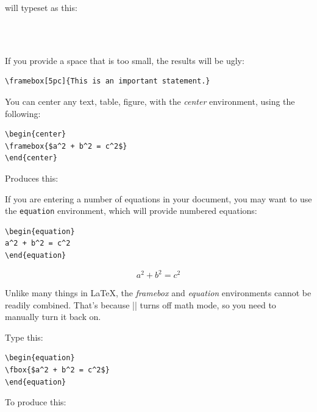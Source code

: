 will typeset as this:

\\
\\

If you provide a space that is too small, the results will be ugly:

\begin{Verbatim}
\framebox[5pc]{This is an important statement.}
\end{Verbatim}


You can center any text, table, figure, \etc with the \emph{center}
environment, using the following:

\begin{Verbatim}
\begin{center}
\framebox{$a^2 + b^2 = c^2$}
\end{center}
\end{Verbatim}

Produces this:

\begin{center}
\end{center}

If you are entering a number of equations in your document, you may want to use
the \texttt{equation} environment, which will provide numbered equations:

\begin{Verbatim}
\begin{equation}
a^2 + b^2 = c^2
\end{equation}
\end{Verbatim}
\begin{equation}
a^2 + b^2 = c^2
\end{equation}

Unlike many things in \LaTeX, the \emph{framebox} and \emph{equation}
environments cannot be readily combined. That's because |\fbox| turns off math
mode, so you need to manually turn it back on.

Type this:

\begin{Verbatim}
\begin{equation}
\fbox{$a^2 + b^2 = c^2$}
\end{equation}
\end{Verbatim}


To produce this:

